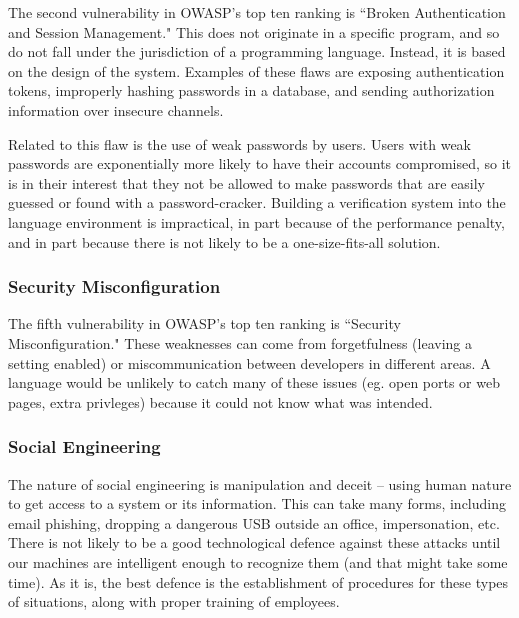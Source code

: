 \documentclass[twocolumn]{article}
\begin{document}
The second vulnerability in OWASP's top ten ranking is ``Broken Authentication and Session Management."\cite{owasp10}  This does not originate in a specific program, and so do not fall under the jurisdiction of a programming language.  Instead, it is based on the design of the system.  Examples of these flaws are exposing authentication tokens, improperly hashing passwords in a database, and sending authorization information over insecure channels.

Related to this flaw is the use of weak passwords by users.  Users with weak passwords are exponentially more likely to have their accounts compromised, so it is in their interest that they not be allowed to make passwords that are easily guessed or found with a password-cracker.  Building a verification system into the language environment is impractical, in part because of the performance penalty, and in part because there is not likely to be a one-size-fits-all solution.

\subsubsection{Security Misconfiguration}

The fifth vulnerability in OWASP's top ten ranking is ``Security Misconfiguration."\cite{owasp10}  These weaknesses can come from forgetfulness (leaving a setting enabled) or miscommunication between developers in different areas.  A language would be unlikely to catch many of these issues (eg. open ports or web pages, extra privleges) because it could not know what was intended.

\subsubsection{Social Engineering}

The nature of social engineering is manipulation and deceit -- using human nature to get access to a system or its information.  This can take many forms, including email phishing, dropping a dangerous USB outside an office, impersonation, etc.  There is not likely to be a good technological defence against these attacks until our machines are intelligent enough to recognize them (and that might take some time).  As it is, the best defence is the establishment of procedures for these types of situations, along with proper training of employees.
\end{document}
